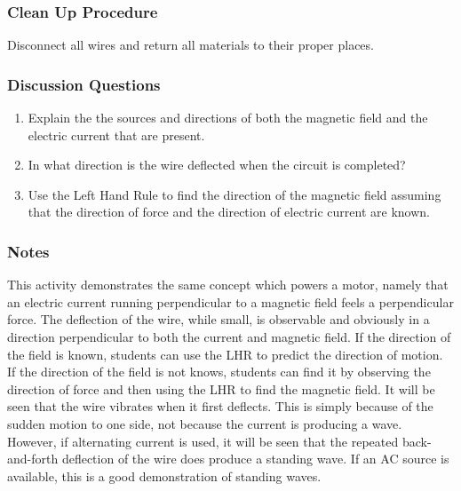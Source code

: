 \subsubsection*{Clean Up Procedure}
Disconnect all wires and return all materials to their proper places.

\subsubsection*{Discussion Questions}
\begin{enumerate}
\item{Explain the the sources and directions of both the magnetic field and the electric current that are present.} 
\item{In what direction is the wire deflected when the circuit is completed?}
\item{Use the Left Hand Rule to find the direction of the magnetic field assuming that the direction of force and the direction of electric current are known.} 
\end{enumerate}

\subsubsection*{Notes}
This activity demonstrates the same concept which powers a motor, namely that an electric current running perpendicular to a magnetic field feels a perpendicular force. The deflection of the wire, while small, is observable and obviously in a direction perpendicular to both the current and magnetic field.  
If the direction of the field is known, students can use the LHR to predict the direction of motion. If the direction of the field is not knows, students can find it by observing the direction of force and then using the LHR to find the magnetic field.  
It will be seen that the wire vibrates when it first deflects. This is simply because of the sudden motion to one side, not because the current is producing a wave. However, if alternating current is used, it will be seen that the repeated back-and-forth deflection of the wire does produce a standing wave. If an AC source is available, this is a good demonstration of standing waves.  


